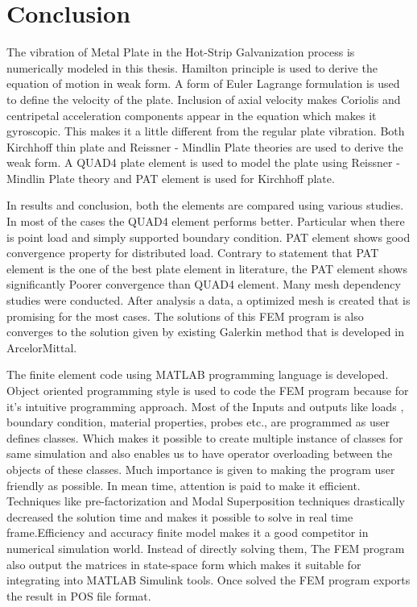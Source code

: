 \documentclass[main.tex]{subfiles}
\begin{document}
\chapter{Conclusion}

The vibration of Metal Plate in the Hot-Strip Galvanization process is numerically modeled in this thesis. Hamilton principle is used to derive the equation of motion in weak form. A form of Euler Lagrange formulation is used to define the velocity of the plate. Inclusion of axial velocity makes Coriolis and centripetal acceleration components appear in the equation which makes it gyroscopic.  This makes it a little different from the regular plate vibration. Both Kirchhoff thin plate and Reissner - Mindlin Plate theories are used to derive the weak form. A QUAD4 plate element is used to model the plate using Reissner - Mindlin Plate theory and PAT element is used for Kirchhoff plate. 

In results and conclusion, both the elements are compared using various studies. In most of the cases the QUAD4 element performs better. Particular when there is point load and simply supported boundary condition. PAT element shows good convergence property for distributed load.  Contrary to statement that PAT element is the one of the best plate element in literature, the PAT element shows significantly Poorer convergence than QUAD4 element. Many mesh dependency studies were conducted. After analysis a data, a optimized mesh is created that is promising for the most cases. The solutions of this FEM program is also converges to the solution given by existing Galerkin method that is developed in ArcelorMittal. 

The  finite element code using MATLAB programming language is developed. Object oriented programming style is used to code the FEM program because for it's intuitive programming approach. Most of the Inputs and outputs like loads , boundary condition, material properties, probes etc., are programmed as user defines classes. Which makes it possible to create multiple instance of classes for same simulation and also enables us to have operator overloading between the objects of these classes. Much importance is given to making the program user friendly as possible. In mean time, attention is paid to make it efficient. Techniques like pre-factorization and Modal Superposition techniques drastically decreased the solution time and makes it possible to solve in real time frame.Efficiency and accuracy finite model makes it a good competitor in numerical simulation world. Instead of directly solving them, The FEM program also output the matrices in state-space form which makes it suitable for integrating into MATLAB Simulink tools. Once solved the FEM program exports the result in POS file format.
\end{document}
